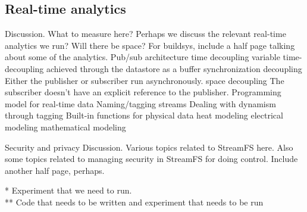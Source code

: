 \subsection{Real-time analytics}
Discussion.  What to measure here?  Perhaps we discuss the relevant real-time analytics we run?  Will there be space?  For buildsys, include a half page talking about some of the analytics.
Pub/sub architecture
time decoupling
variable time-decoupling achieved through the datastore as a buffer
synchronization decoupling
Either the publisher or subscriber run asynchronously.
space decoupling
The subscriber doesn’t have an explicit reference to the publisher.
Programming model for real-time data
Naming/tagging streams
Dealing with dynamism through tagging
Built-in functions for physical data
heat modeling
electrical modeling
mathematical modeling

Security and privacy
Discussion.  Various topics related to StreamFS here.  Also some topics related to managing security in StreamFS for doing control.  Include another half page, perhaps.


* Experiment that we need to run.\\
** Code that needs to be written and experiment that needs to be run